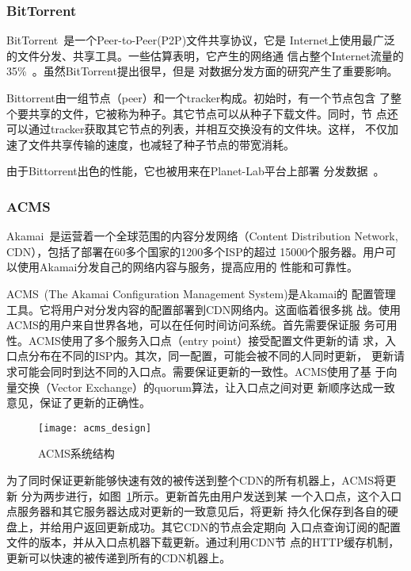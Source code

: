 \subsubsection*{BitTorrent}

BitTorrent~\cite{bittorrent}是一个Peer-to-Peer(P2P)文件共享协议，它是
Internet上使用最广泛的文件分发、共享工具。一些估算表明，它产生的网络通
信占整个Internet流量的35\%~\cite{bt2004}。虽然BitTorrent提出很早，但是
对数据分发方面的研究产生了重要影响。

Bittorrent由一组节点（peer）和一个tracker构成。初始时，有一个节点包含
了整个要共享的文件，它被称为种子。其它节点可以从种子下载文件。同时，节
点还可以通过tracker获取其它节点的列表，并相互交换没有的文件块。这样，
不仅加速了文件共享传输的速度，也减轻了种子节点的带宽消耗。

由于Bittorrent出色的性能，它也被用来在Planet-Lab平台上部署
分发数据~\cite{plDist}。

\subsubsection*{ACMS}

Akamai~\cite{akamai}是运营着一个全球范围的内容分发网络（Content
Distribution Network, CDN），包括了部署在60多个国家的1200多个ISP的超过
15000个服务器。用户可以使用Akamai分发自己的网络内容与服务，提高应用的
性能和可靠性。

ACMS~\cite{acms}(The Akamai Configuration Management System)是Akamai的
配置管理工具。它将用户对分发内容的配置部署到CDN网络内。这面临着很多挑
战。使用ACMS的用户来自世界各地，可以在任何时间访问系统。首先需要保证服
务可用性。ACMS使用了多个服务入口点（entry point）接受配置文件更新的请
求，入口点分布在不同的ISP内。其次，同一配置，可能会被不同的人同时更新，
更新请求可能会同时到达不同的入口点。需要保证更新的一致性。ACMS使用了基
于向量交换（Vector Exchange）的quorum算法，让入口点之间对更
新顺序达成一致意见，保证了更新的正确性。

\begin{figure}
\centering
\texttt{[image: acms\_design]}
\caption{ACMS系统结构}
\label{fig:acms_design}
\end{figure}


为了同时保证更新能够快速有效的被传送到整个CDN的所有机器上，ACMS将更新
分为两步进行，如图~\ref{fig:acms_design}所示。更新首先由用户发送到某
一个入口点，这个入口点服务器和其它服务器达成对更新的一致意见后，将更新
持久化保存到各自的硬盘上，并给用户返回更新成功。其它CDN的节点会定期向
入口点查询订阅的配置文件的版本，并从入口点机器下载更新。通过利用CDN节
点的HTTP缓存机制，更新可以快速的被传递到所有的CDN机器上。

